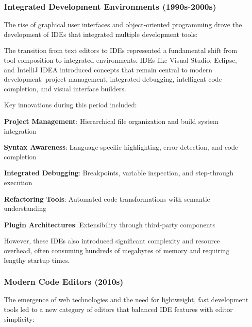 \subsubsection{Integrated Development Environments (1990s-2000s)}

The rise of graphical user interfaces and object-oriented programming drove the development of IDEs that integrated multiple development tools:

\begin{infobox}[title=IDE Revolution: Integration and Productivity]
The transition from text editors to IDEs represented a fundamental shift from tool composition to integrated environments. IDEs like Visual Studio, Eclipse, and IntelliJ IDEA introduced concepts that remain central to modern development: project management, integrated debugging, intelligent code completion, and visual interface builders.
\end{infobox}

Key innovations during this period included:

\begin{compactlist}
    \item \textbf{Project Management}: Hierarchical file organization and build system integration
    \item \textbf{Syntax Awareness}: Language-specific highlighting, error detection, and code completion
    \item \textbf{Integrated Debugging}: Breakpoints, variable inspection, and step-through execution
    \item \textbf{Refactoring Tools}: Automated code transformations with semantic understanding
    \item \textbf{Plugin Architectures}: Extensibility through third-party components
\end{compactlist}

However, these IDEs also introduced significant complexity and resource overhead, often consuming hundreds of megabytes of memory and requiring lengthy startup times.

\subsubsection{Modern Code Editors (2010s)}

The emergence of web technologies and the need for lightweight, fast development tools led to a new category of editors that balanced IDE features with editor simplicity:

